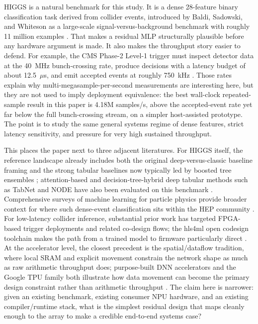 \documentclass[a4paper,11pt]{article}
\begin{document}
HIGGS is a natural benchmark for this study. It is a dense 28-feature binary
classification task derived from collider events, introduced by Baldi,
Sadowski, and Whiteson as a large-scale signal-versus-background benchmark with
roughly 11 million examples \cite{baldi-higgs,uci-higgs}. That makes a residual
MLP structurally plausible before any hardware argument is made. It also makes
the throughput story easier to defend. For example, the CMS Phase-2 Level-1
trigger must inspect detector data at the 40~MHz bunch-crossing rate, produce
decisions with a latency budget of about 12.5~$\mu$s, and emit accepted events
at roughly 750~kHz \cite{cms-phase2-l1}. Those rates explain why
multi-megasample-per-second measurements are interesting here, but they are not
used to imply deployment equivalence: the best wall-clock repeated-sample
result in this paper is 4.18M samples/s, above the accepted-event rate yet far
below the full bunch-crossing stream, on a simpler host-assisted prototype.
The point is to study the same general systems regime of dense features, strict
latency sensitivity, and pressure for very high sustained throughput.

This places the paper next to three adjacent literatures. For HIGGS itself, the
reference landscape already includes both the original deep-versus-classic
baseline framing and the strong tabular baselines now typically led by boosted
tree ensembles \cite{baldi-higgs,xgboost-kdd,lightgbm-nips,catboost-paper,rtdl-revisiting,grinsztajn-tabular}; attention-based and decision-tree-hybrid deep tabular methods such as TabNet and NODE have also been evaluated on this benchmark \cite{tabnet,node-paper}. Comprehensive surveys of machine learning for particle physics provide broader context for where such dense-event classification sits within the HEP community \cite{ml4hep-review}. For
low-latency collider inference, substantial prior work has targeted FPGA-based
trigger deployments and related co-design flows; the hls4ml open codesign
toolchain makes the path from a trained model to firmware particularly direct
\cite{duarte-fpga,hls4ml,cms-phase2-l1}. At
the accelerator level, the closest precedent is the spatial/dataflow tradition,
where local SRAM and explicit movement constrain the network shape as much as
raw arithmetic throughput does; purpose-built DNN accelerators and the Google
TPU family both illustrate how data movement can become the primary design
constraint rather than arithmetic throughput \cite{dadiannao,eyeriss,tpu-isca17}. The claim here is
narrower: given an existing benchmark, existing consumer NPU hardware, and an
existing compiler/runtime stack, what is the simplest residual design that maps
cleanly enough to the array to make a credible end-to-end systems case?
\end{document}
